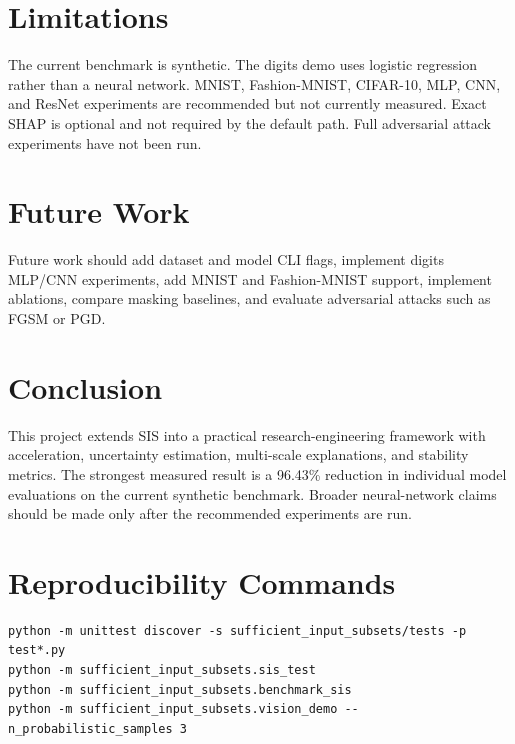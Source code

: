 \documentclass[11pt]{article}
\begin{document}
\section{Limitations}
The current benchmark is synthetic. The digits demo uses logistic regression rather than a neural network. MNIST, Fashion-MNIST, CIFAR-10, MLP, CNN, and ResNet experiments are recommended but not currently measured. Exact SHAP is optional and not required by the default path. Full adversarial attack experiments have not been run.

\section{Future Work}
Future work should add dataset and model CLI flags, implement digits MLP/CNN experiments, add MNIST and Fashion-MNIST support, implement ablations, compare masking baselines, and evaluate adversarial attacks such as FGSM or PGD.

\section{Conclusion}
This project extends SIS into a practical research-engineering framework with acceleration, uncertainty estimation, multi-scale explanations, and stability metrics. The strongest measured result is a 96.43\% reduction in individual model evaluations on the current synthetic benchmark. Broader neural-network claims should be made only after the recommended experiments are run.

\section*{Reproducibility Commands}
\begin{verbatim}
python -m unittest discover -s sufficient_input_subsets/tests -p test*.py
python -m sufficient_input_subsets.sis_test
python -m sufficient_input_subsets.benchmark_sis
python -m sufficient_input_subsets.vision_demo --n_probabilistic_samples 3
\end{verbatim}
\end{document}
